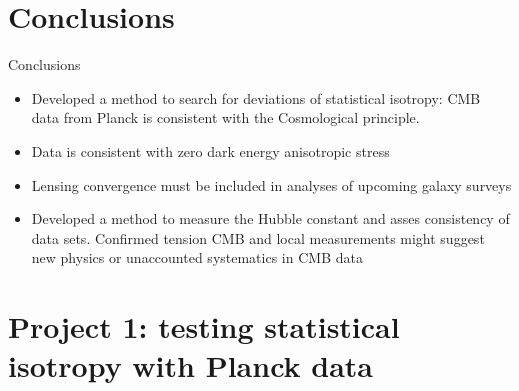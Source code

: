 \documentclass{beamer}
\begin{document}


\section{Conclusions}

\begin{frame}{Conclusions}
\begin{itemize}
\item Developed a method to search for deviations of statistical isotropy: CMB data from Planck is consistent with the Cosmological principle. 
\item Data is consistent with zero dark energy anisotropic stress
\item Lensing convergence must be included in analyses of upcoming galaxy surveys
\item Developed a method to measure the Hubble constant and asses consistency of data sets. Confirmed tension CMB and local measurements might suggest new physics or unaccounted systematics in CMB data    
\end{itemize}
\end{frame}


\section*{Project 1: testing statistical isotropy with Planck data}
\end{document}
